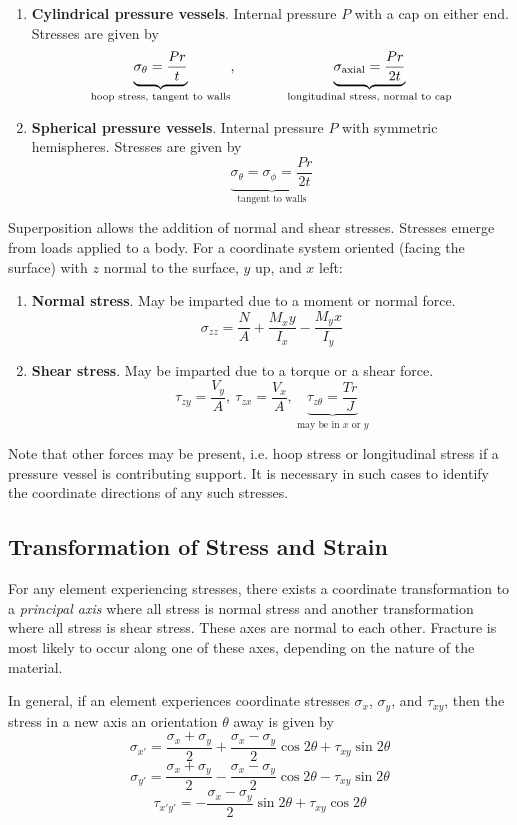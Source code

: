 \begin{enumerate}
    \item[] \textbf{Cylindrical pressure vessels}. Internal pressure $P$ with a cap on either end. Stresses are given by \[\underbrace{\sigma_\theta = \frac{Pr}{t}}_\text{hoop stress, tangent to walls},\hspace{0.5in}\underbrace{\sigma_\text{axial} = \frac{Pr}{2t}}_\text{longitudinal stress, normal to cap}\]
    \item[] \textbf{Spherical pressure vessels}. Internal pressure $P$ with symmetric hemispheres. Stresses are given by \[\underbrace{\sigma_\theta = \sigma_\phi = \frac{Pr}{2t}}_\text{tangent to walls}\]
\end{enumerate}

Superposition allows the addition of normal and shear stresses. Stresses emerge from loads applied to a body. For a coordinate system oriented (facing the surface) with $z$ normal to the surface, $y$ up, and $x$ left:

\begin{enumerate}
    \item[] \textbf{Normal stress}. May be imparted due to a moment or normal force. \[\sigma_{zz} = \frac{N}{A} + \frac{M_xy}{I_x} - \frac{M_yx}{I_y}\]
    \item[] \textbf{Shear stress}. May be imparted due to a torque or a shear force. \[\tau_{zy} = \frac{V_y}{A},\ \tau_{zx} = \frac{V_x}{A},\ \underbrace{\tau_{z\theta} = \frac{Tr}{J}}_\text{may be in $x$ or $y$}\]
\end{enumerate}

Note that other forces may be present, i.e. hoop stress or longitudinal stress if a pressure vessel is contributing support. It is necessary in such cases to identify the coordinate directions of any such stresses.

\subsection{Transformation of Stress and Strain}

For any element experiencing stresses, there exists a coordinate transformation to a \textit{principal axis} where all stress is normal stress and another transformation where all stress is shear stress. These axes are normal to each other. Fracture is most likely to occur along one of these axes, depending on the nature of the material.

In general, if an element experiences coordinate stresses $\sigma_x$, $\sigma_y$, and $\tau_{xy}$, then the stress in a new axis an orientation $\theta$ away is given by \[\sigma_{x'} = \frac{\sigma_x + \sigma_y}{2}+ \frac{\sigma_x - \sigma_y}{2}\cos 2\theta + \tau_{xy}\sin2\theta\]
    \[\sigma_{y'} = \frac{\sigma_x + \sigma_y}{2} - \frac{\sigma_x - \sigma_y}{2}\cos 2\theta - \tau_{xy}\sin2\theta\]
    \[\tau_{x'y'} = -\frac{\sigma_x -\sigma_y}{2}\sin2\theta + \tau_{xy}\cos2\theta\]


